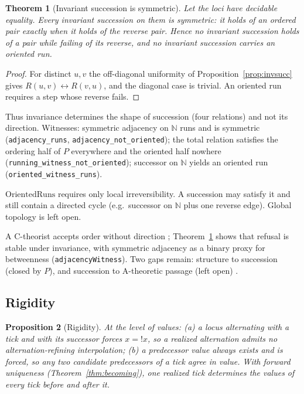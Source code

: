 \documentclass[11pt]{article}
\newtheorem{theorem}{Theorem}[section]
\newtheorem{proposition}[theorem]{Proposition}
\newcommand{\lf}[1]{\texttt{#1}}
\begin{document}
\begin{theorem}[Invariant succession is symmetric]
\label{thm:orientation}
Let the loci have decidable equality. Every invariant succession on them is symmetric: it holds of an ordered pair exactly when it holds of the reverse pair. Hence no invariant succession holds of a pair while failing of its reverse, and no invariant succession carries an oriented run.
\end{theorem}

\begin{proof}
For distinct $u,v$ the off-diagonal uniformity of Proposition~\ref{prop:invsucc} gives $R(u,v) \leftrightarrow R(v,u)$, and the diagonal case is trivial. An oriented run requires a step whose reverse fails.
\end{proof}

Thus invariance determines the shape of succession (four relations) and not its direction. Witnesses: symmetric adjacency on $\mathbb{N}$ runs and is symmetric (\lf{adjacency\_runs}, \lf{adjacency\_not\_oriented}); the total relation satisfies the ordering half of $P$ everywhere and the oriented half nowhere (\lf{running\_witness\_not\_oriented}); successor on $\mathbb{N}$ yields an oriented run (\lf{oriented\_witness\_runs}).

$\mathrm{OrientedRuns}$ requires only local irreversibility. A succession may satisfy it and still contain a directed cycle (e.g.\ successor on $\mathbb{N}$ plus one reverse edge). Global topology is left open.

A C-theorist accepts order without direction \cite{farr2020,mctaggart1908}; Theorem~\ref{thm:orientation} shows that refusal is stable under invariance, with symmetric adjacency as a binary proxy for betweenness (\lf{adjacencyWitness}). Two gaps remain: structure to succession (closed by $P$), and succession to A-theoretic passage (left open) \cite{sider2001,williams1951}.

\subsection{Rigidity}

\begin{proposition}[Rigidity]
\label{prop:rigidity}
At the level of values: (a) a locus alternating with a tick and with its successor forces $x = !x$, so a realized alternation admits no alternation-refining interpolation; (b) a predecessor value always exists and is forced, so any two candidate predecessors of a tick agree in value. With forward uniqueness (Theorem~\ref{thm:becoming}), one realized tick determines the values of every tick before and after it.
\end{proposition}
\end{document}
